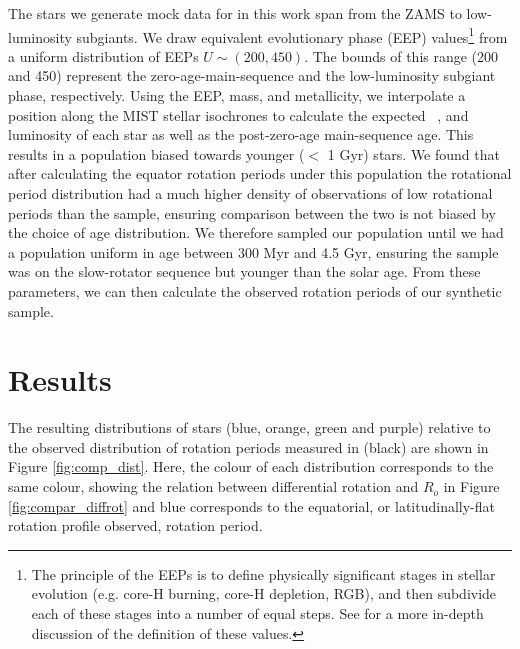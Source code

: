 The stars we generate mock data for in this work span from the ZAMS to low-luminosity subgiants.
We draw equivalent evolutionary phase (EEP) values\footnote{The principle of the EEPs is to define physically significant stages in stellar evolution (e.g. core-H burning, core-H depletion, RGB), and then subdivide each of these stages into a number of equal steps. See \citet{morton_isochrones_2015} for a more in-depth discussion of the definition of these values.} from a uniform distribution of EEPs $U\sim(200,450)$.
The bounds of this range (200 and 450) represent the zero-age-main-sequence and the low-luminosity subgiant phase, respectively.
Using the EEP, mass, and metallicity, we interpolate a position along the MIST stellar isochrones \citep{morton_isochrones_2015} to calculate the expected \teff \ , and luminosity of each star as well as the post-zero-age main-sequence age.
This results in a population biased towards younger ($<$ 1 Gyr) stars.
We found that after calculating the equator rotation periods under this population the rotational period distribution had a much higher density of observations of low rotational periods than the \citet{mcquillan_rotation_2014} sample, ensuring comparison between the two is not biased by the choice of age distribution.
We therefore sampled our population until we had a population uniform in age between 300 Myr and 4.5 Gyr, ensuring the sample was on the slow-rotator sequence but younger than the solar age.
From these parameters, we can then calculate the observed rotation periods of our synthetic sample.

\section{Results}
\label{sec:results}

The resulting distributions of stars (blue, orange, green and purple) relative to the observed distribution of \kepler{} rotation periods measured in \citet{mcquillan_rotation_2014} (black) are shown in Figure \ref{fig:comp_dist}.
Here, the colour of each distribution corresponds to the same colour, showing the relation between differential rotation and $R_o$ in Figure \ref{fig:compar_diffrot} and blue corresponds to the equatorial, or latitudinally-flat rotation profile observed, rotation period.

